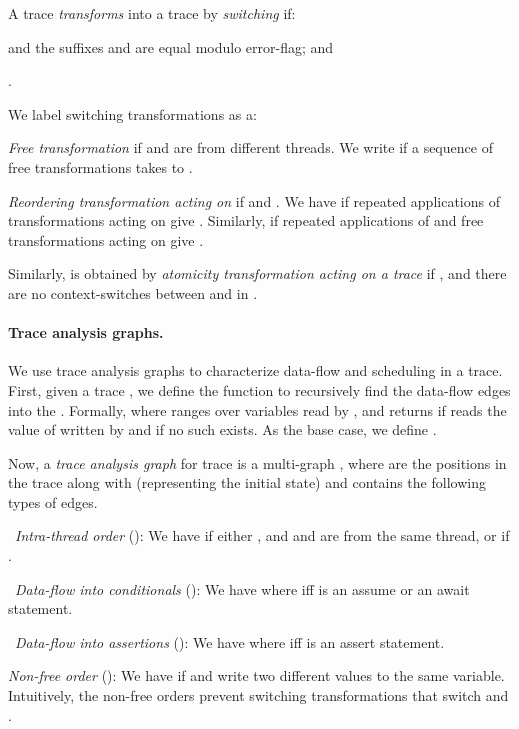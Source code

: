 \documentclass{llncs}
\begin{document}
A trace 
{\em transforms} into a trace  by {\em switching} if:
\begin{inparaenum}[(a)]
\item  and the suffixes
   and  are equal modulo error-flag; and
\item .
\end{inparaenum}
We label switching transformations as a:
\begin{compactitem}
\item {\em Free transformation} if  and  are from
  different threads. 
  We write  if a sequence of free transformations
  takes  to .
\item {\em Reordering transformation  acting on } if 
    and .
We have  if repeated applications of
   transformations acting on  give . 
  Similarly,  if repeated applications of
   and free transformations acting on 
  give .
\end{compactitem}
Similarly,  is obtained by {\em atomicity
transformation  acting on a trace} 
if , and there are no context-switches between
 and  in .

\paragraph{Trace analysis graphs.}
We use trace analysis graphs to characterize data-flow and
scheduling in a trace.
First, given a trace , we define
the function  to recursively find the data-flow
edges into the .
Formally,  where  ranges over variables read by , and
 returns  if  reads the value of  written by
 and  if no such  exists.
As the base case, we define .


Now, a {\em trace analysis graph} for trace  is a
multi-graph  , where  are the positions in the trace along
with  (representing the initial state) and  contains the
following types of edges.
\begin{compactenum}
\item~{\em Intra-thread order} (): We have  if either
  , and  and  are from the same thread, or if .
\item~{\em Data-flow into conditionals} (): We have
   where  iff  is an assume or an await statement.
\item~{\em Data-flow into assertions} (): We have
   where
   iff  is an assert statement.
\item {\em Non-free order} (): We have  if  and
   write two different values to the same variable. 
  Intuitively, the non-free orders prevent switching transformations
  that switch  and .
\end{compactenum}
\end{document}
